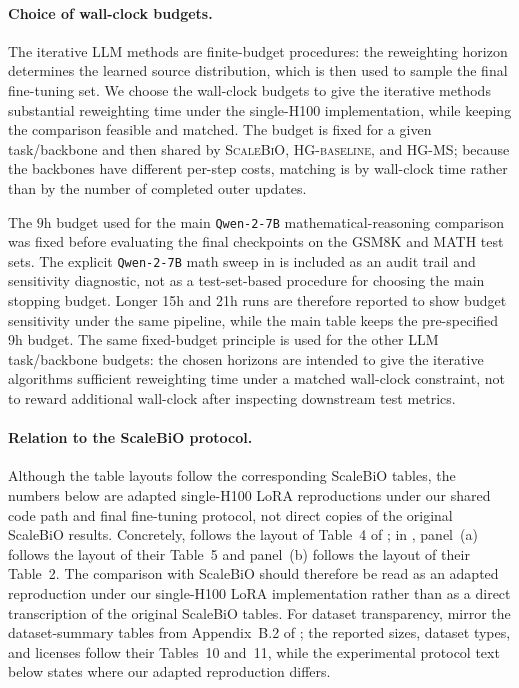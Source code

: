 \documentclass{article}
\theoremstyle{normaltheorem}
\begin{document}
\paragraph{Choice of wall-clock budgets.}
The iterative LLM methods are finite-budget procedures: the reweighting horizon determines the learned source distribution, which is then used to sample the final fine-tuning set. We choose the wall-clock budgets to give the iterative methods substantial reweighting time under the single-H100 implementation, while keeping the comparison feasible and matched. The budget is fixed for a given task/backbone and then shared by \textsc{ScaleBiO}, \textsc{HG-baseline}, and \textsc{HG-MS}; because the backbones have different per-step costs, matching is by wall-clock time rather than by the number of completed outer updates.

The \(9\)h budget used for the main \texttt{Qwen-2-7B} mathematical-reasoning comparison was fixed before evaluating the final checkpoints on the GSM8K and MATH test sets. The explicit \texttt{Qwen-2-7B} math sweep in  is included as an audit trail and sensitivity diagnostic, not as a test-set-based procedure for choosing the main stopping budget. Longer 15h and 21h runs are therefore reported to show budget sensitivity under the same pipeline, while the main table keeps the pre-specified 9h budget. The same fixed-budget principle is used for the other LLM task/backbone budgets: the chosen horizons are intended to give the iterative algorithms sufficient reweighting time under a matched wall-clock constraint, not to reward additional wall-clock after inspecting downstream test metrics.

\paragraph{Relation to the ScaleBiO protocol.}
Although the table layouts follow the corresponding ScaleBiO tables, the numbers below are adapted single-H100 LoRA reproductions under our shared code path and final fine-tuning protocol, not direct copies of the original ScaleBiO results.
Concretely,  follows the layout of Table~4 of \citet{pan2025scalebio}; in , panel~(a) follows the layout of their Table~5 and panel~(b) follows the layout of their Table~2.
The comparison with ScaleBiO should therefore be read as an adapted reproduction under our single-H100 LoRA implementation rather than as a direct transcription of the original ScaleBiO tables.
For dataset transparency,  mirror the dataset-summary tables from Appendix~B.2 of \citet{pan2025scalebio}; the reported sizes, dataset types, and licenses follow their Tables~10 and~11, while the experimental protocol text below states where our adapted reproduction differs.
\end{document}
